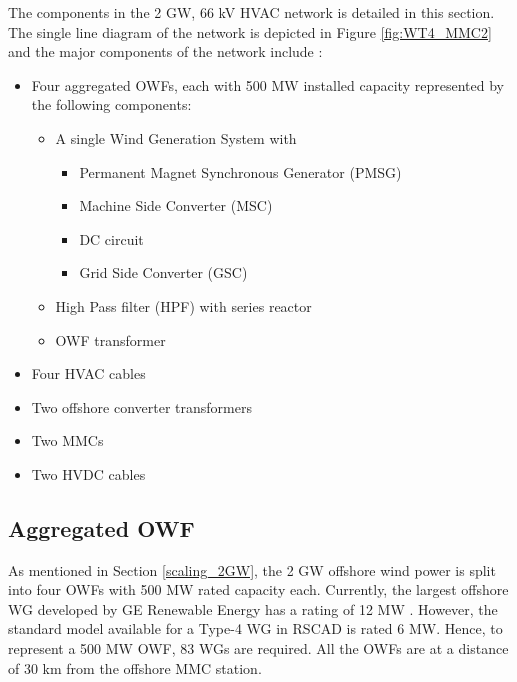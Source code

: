 The components in the 2 GW, 66 kV \gls{HVAC} network is detailed in this section. The single line diagram of the network is depicted in Figure \ref{fig:WT4_MMC2} and the major components of the network include :
\begin{itemize}
    \item Four aggregated \gls{OWF}s, each with 500 MW installed capacity represented by the following components:
    \begin{itemize}
        \item A single Wind Generation System with 
    \begin{itemize}
        \item Permanent Magnet Synchronous Generator (\gls{PMSG})
        \item Machine Side Converter (\gls{MSC})
        \item \gls{DC} circuit
        \item Grid Side Converter (\gls{GSC}) 
    \end{itemize}
        \item High Pass filter (\gls{HPF}) with series reactor
        \item \gls{OWF} transformer
    \end{itemize}
    \item Four \gls{HVAC} cables  
    \item Two offshore converter transformers
    \item Two \gls{MMC}s
    \item Two \gls{HVDC} cables
\end{itemize}

\subsection{Aggregated OWF}\label{Aggregated_OWF_large_scale}
As mentioned in Section \ref{scaling_2GW}, the 2 GW offshore wind power is split into four \gls{OWF}s with 500 MW rated capacity each. Currently, the largest offshore \gls{WG} developed by GE Renewable Energy has a rating of 12 MW \cite{noauthor_worlds_nodate}. However, the standard model available for a Type-4 \gls{WG} in RSCAD is rated 6 MW. Hence, to represent a 500 MW \gls{OWF}, 83 \gls{WG}s are required. All the \gls{OWF}s are at a distance of 30 km from the offshore \gls{MMC} station. 


